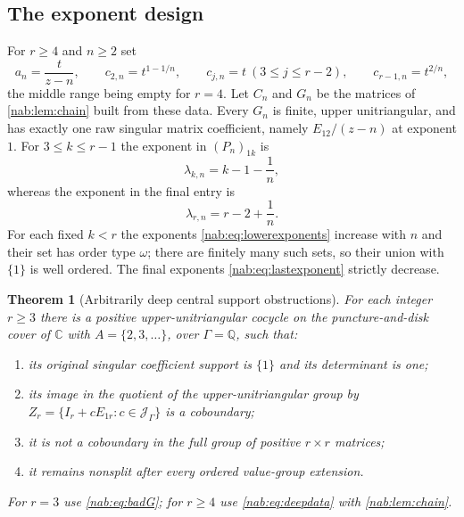 \documentclass[11pt,letterpaper]{article}
\newtheorem{theorem}{Theorem}[section]
\theoremstyle{definition}
\theoremstyle{remark}
\newcommand{\C}{\mathbb C}
\newcommand{\Q}{\mathbb Q}
\newcommand{\JJ}{\mathscr J_\Gamma}
\numberwithin{equation}{section}
\begin{document}
\subsection{The exponent design}

For $r\geq4$ and $n\geq2$ set
\begin{equation}\label{nab:eq:deepdata}
 a_n=\frac{t}{z-n},\qquad
 c_{2,n}=t^{1-1/n},\qquad
 c_{j,n}=t\ (3\leq j\leq r-2),\qquad
 c_{r-1,n}=t^{2/n},
\end{equation}
the middle range being empty for $r=4$. Let $C_n$ and $G_n$ be the matrices of
\cref{nab:lem:chain} built from these data. Every $G_n$ is finite, upper
unitriangular, and has exactly one raw singular matrix coefficient, namely
$E_{12}/(z-n)$ at exponent $1$. For $3\leq k\leq r-1$ the exponent in
$(P_n)_{1k}$ is
\begin{equation}\label{nab:eq:lowerexponents}
 \lambda_{k,n}=k-1-\frac1n,
\end{equation}
whereas the exponent in the final entry is
\begin{equation}\label{nab:eq:lastexponent}
 \lambda_{r,n}=r-2+\frac1n.
\end{equation}
For each fixed $k<r$ the exponents \eqref{nab:eq:lowerexponents} increase with
$n$ and their set has order type $\omega$; there are finitely many such sets,
so their union with $\{1\}$ is well ordered. The final exponents
\eqref{nab:eq:lastexponent} strictly decrease.

\begin{theorem}[Arbitrarily deep central support obstructions]
\label{nab:thm:depth}
For each integer $r\geq3$ there is a positive upper-unitriangular cocycle on
the puncture-and-disk cover of $\C$ with $A=\{2,3,\ldots\}$, over
$\Gamma=\Q$, such that:
\begin{enumerate}[label=\textup{(\roman*)}]
\item its original singular coefficient support is $\{1\}$ and its determinant
is one;
\item its image in the quotient of the upper-unitriangular group by
$Z_r=\{I_r+cE_{1r}:c\in\JJ\}$ is a coboundary;
\item it is not a coboundary in the full group of positive $r\times r$
matrices;
\item it remains nonsplit after every ordered value-group extension.
\end{enumerate}
For $r=3$ use \eqref{nab:eq:badG}; for $r\geq4$ use \eqref{nab:eq:deepdata}
with \cref{nab:lem:chain}.
\end{theorem}
\end{document}
